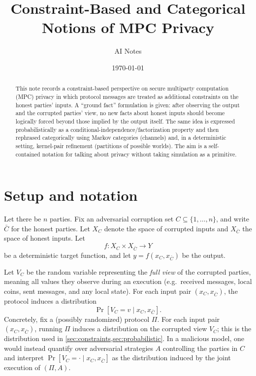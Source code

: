 \documentclass[11pt,a4paper]{article}
\title{Constraint-Based and Categorical Notions of MPC Privacy}
\author{AI Notes}
\date{\today}
\theoremstyle{definition}
\theoremstyle{remark}
\begin{document}
\maketitle

\begin{abstract}
This note records a constraint-based perspective on secure multiparty computation (MPC) privacy in which protocol messages are treated as additional constraints on the honest parties' inputs. A ``ground fact'' formulation is given: after observing the output and the corrupted parties' view, no new facts about honest inputs should become logically forced beyond those implied by the output itself. The same idea is expressed probabilistically as a conditional-independence/factorization property and then rephrased categorically using Markov categories (channels) and, in a deterministic setting, kernel-pair refinement (partitions of possible worlds). The aim is a self-contained notation for talking about privacy without taking simulation as a primitive.
\end{abstract}

\section{Setup and notation}
\label{sec:setup}

Let there be $n$ parties. Fix an adversarial corruption set $C\subseteq \{1,\dots,n\}$, and write $\bar C$ for the honest parties.
Let $X_C$ denote the space of corrupted inputs and $X_{\bar C}$ the space of honest inputs. Let
\[
f : X_C \times X_{\bar C} \to Y
\]
be a deterministic target function, and let $y=f(x_C,x_{\bar C})$ be the output.

Let $V_C$ be the random variable representing the \emph{full view} of the corrupted parties, meaning all values they observe during an execution (e.g.\ received messages, local coins, sent messages, and any local state). For each input pair $(x_C,x_{\bar C})$, the protocol induces a distribution
\[
\Pr[V_C = v \mid x_C,x_{\bar C}].
\]
Concretely, fix a (possibly randomized) protocol $\Pi$. For each input pair $(x_C,x_{\bar C})$, running $\Pi$ induces a distribution on the corrupted view $V_C$; this is the distribution used in \cref{sec:constraints,sec:probabilistic}. In a malicious model, one would instead quantify over adversarial strategies $A$ controlling the parties in $C$ and interpret $\Pr[V_C=\cdot\mid x_C,x_{\bar C}]$ as the distribution induced by the joint execution of $(\Pi,A)$.
\end{document}
